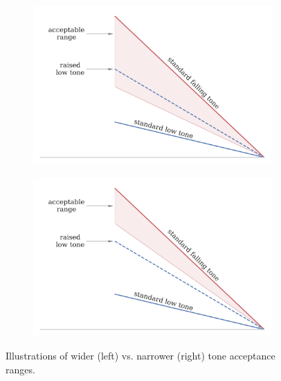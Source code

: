 \begin{figure}[hbt!]
\centering
\begin{subfigure}[b]{.495\textwidth}
\centering
\includegraphics[width=\textwidth]{figures/Tone_acceptance_illustration_wide.png}
\end{subfigure}
\begin{subfigure}[b]{.495\textwidth}
\centering
\includegraphics[width=\textwidth]{figures/Tone_acceptance_illustration_narrow.png}
\end{subfigure}

\caption{Illustrations of wider (left) vs. narrower (right) tone acceptance ranges.}
\label{Figure:ToneAcceptanceIllustration}
\end{figure}
